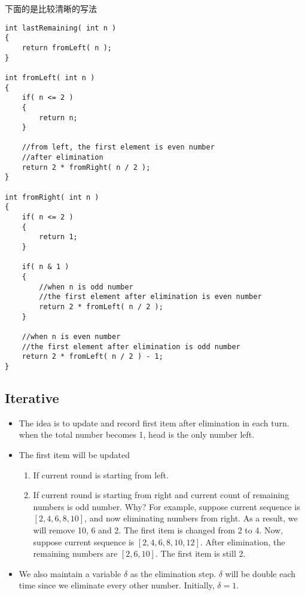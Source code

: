 下面的是比较清晰的写法
\begin{lstlisting}[style=customc, caption={Recursion Break Down}]
int lastRemaining( int n )
{
    return fromLeft( n );
}

int fromLeft( int n )
{
    if( n <= 2 )
    {
        return n;
    }

    //from left, the first element is even number
    //after elimination
    return 2 * fromRight( n / 2 );
}

int fromRight( int n )
{
    if( n <= 2 )
    {
        return 1;
    }

    if( n & 1 )
    {
        //when n is odd number
        //the first element after elimination is even number
        return 2 * fromLeft( n / 2 );
    }

    //when n is even number
    //the first element after elimination is odd number
    return 2 * fromLeft( n / 2 ) - 1;
}
\end{lstlisting}

\subsection{Iterative}
\begin{itemize}
\item The idea is to update and record first item after elimination in each turn. when the total number becomes 1, head is the only number left.
\item The first item will be updated 
\begin{enumerate}
\item If current round is starting from left.
\item If current round is starting from right and current count of remaining numbers is odd number. Why? For example, suppose current sequence is $[2, 4, 6, 8, 10]$, and now eliminating numbers from right. As a result, we will remove 10, 6 and 2. The first item is changed from 2 to 4. Now, suppose current sequence is $[2, 4, 6, 8, 10, 12]$. After elimination, the remaining numbers are $[2,6,10]$. The first item is still 2.
\end{enumerate}
\item We also maintain a variable $\delta$ as the elimination step. $\delta$ will be double each time since we eliminate every other number. Initially, $\delta=1$.
\end{itemize}


